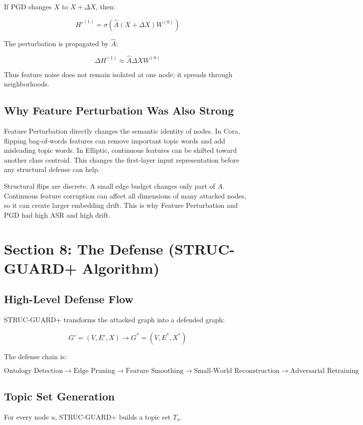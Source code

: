 \documentclass[12pt,a4paper]{article}
\begin{document}
If PGD changes $X$ to $X+\Delta X$, then:

$$
H'^{(1)}=\sigma(\hat{A}(X+\Delta X)W^{(0)})
$$

The perturbation is propagated by $\hat{A}$:

$$
\Delta H^{(1)}\approx \hat{A}\Delta XW^{(0)}
$$

Thus feature noise does not remain isolated at one node; it spreads through neighborhoods.

\subsection{Why Feature Perturbation Was Also Strong}
Feature Perturbation directly changes the semantic identity of nodes. In Cora, flipping bag-of-words features can remove important topic words and add misleading topic words. In Elliptic, continuous features can be shifted toward another class centroid. This changes the first-layer input representation before any structural defense can help.

Structural flips are discrete. A small edge budget changes only part of $A$. Continuous feature corruption can affect all dimensions of many attacked nodes, so it can create larger embedding drift. This is why Feature Perturbation and PGD had high ASR and high drift.

\section{Section 8: The Defense (STRUC-GUARD+ Algorithm)}

\subsection{High-Level Defense Flow}
STRUC-GUARD+ transforms the attacked graph into a defended graph:

$$
G'=(V,E',X)\rightarrow G^*=(V,E^*,X^*)
$$

The defense chain is:

$$
\text{Ontology Detection}\rightarrow\text{Edge Pruning}\rightarrow\text{Feature Smoothing}\rightarrow\text{Small-World Reconstruction}\rightarrow\text{Adversarial Retraining}
$$

\subsection{Topic Set Generation}
For every node $u$, STRUC-GUARD+ builds a topic set $T_u$.
\end{document}
